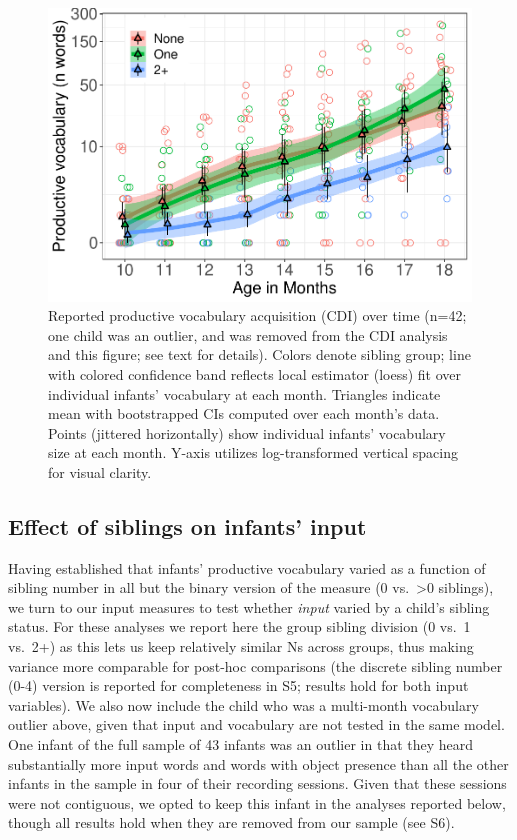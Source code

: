 \documentclass[
  man,mask,floatsintext]{apa6}
\begin{document}
\begin{figure}
\centering
\includegraphics{SiblingsStudyText-anon-revisions_files/figure-latex/Figure-SibGroup-1.pdf}
\caption{\label{fig:Figure-SibGroup}Reported productive vocabulary acquisition (CDI) over time (n=42; one child was an outlier, and was removed from the CDI analysis and this figure; see text for details). Colors denote sibling group; line with colored confidence band reflects local estimator (loess) fit over individual infants' vocabulary at each month. Triangles indicate mean with bootstrapped CIs computed over each month's data. Points (jittered horizontally) show individual infants' vocabulary size at each month. Y-axis utilizes log-transformed vertical spacing for visual clarity.}
\end{figure}

\hypertarget{effect-of-siblings-on-infants-input}{%
\subsection{Effect of siblings on infants' input}\label{effect-of-siblings-on-infants-input}}

Having established that infants' productive vocabulary varied as a function of sibling number in all but the binary version of the measure (0 vs.~\textgreater0 siblings), we turn to our input measures to test whether \emph{input} varied by a child's sibling status. For these analyses we report here the group sibling division (0 vs.~1 vs.~2+) as this lets us keep relatively similar Ns across groups, thus making variance more comparable for post-hoc comparisons (the discrete sibling number (0-4) version is reported for completeness in S5; results hold for both input variables). We also now include the child who was a multi-month vocabulary outlier above, given that input and vocabulary are not tested in the same model. One infant of the full sample of 43 infants was an outlier in that they heard substantially more input words and words with object presence than all the other infants in the sample in four of their recording sessions. Given that these sessions were not contiguous, we opted to keep this infant in the analyses reported below, though all results hold when they are removed from our sample (see S6).
\end{document}
